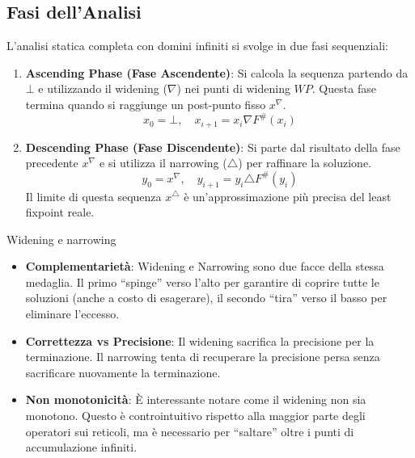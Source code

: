 \subsection{Fasi dell'Analisi}

L'analisi statica completa con domini infiniti si svolge in due fasi sequenziali:

\begin{enumerate}
    \item \textbf{Ascending Phase (Fase Ascendente)}:
    Si calcola la sequenza partendo da $\bot$ e utilizzando il widening
    ($\nabla$) nei punti di widening $WP$. Questa fase termina quando si
    raggiunge un post-punto fisso $x^\nabla$.
    \[ x_0 = \bot, \quad x_{i+1} = x_i \nabla F^\#(x_i) \]

    \item \textbf{Descending Phase (Fase Discendente)}:
    Si parte dal risultato della fase precedente $x^\nabla$ e si utilizza
    il narrowing ($\triangle$) per raffinare la soluzione.
    \[ y_0 = x^\nabla, \quad y_{i+1} = y_i \triangle F^\#(y_i) \]
    Il limite di questa sequenza $x^\triangle$ è un'approssimazione più
    precisa del least fixpoint reale.
\end{enumerate}

\begin{nota}{Widening e narrowing}{}
    
    \begin{itemize}
        \item \textbf{Complementarietà}: Widening e Narrowing sono due facce
        della stessa medaglia.
        Il primo ``spinge'' verso l'alto per garantire di coprire tutte le
        soluzioni (anche a costo di esagerare), il secondo ``tira'' verso il
        basso per eliminare l'eccesso.
        \item \textbf{Correttezza vs Precisione}: Il widening sacrifica la
        precisione per la terminazione.
        Il narrowing tenta di recuperare la precisione persa senza sacrificare
        nuovamente la terminazione.
        \item \textbf{Non monotonicità}: È interessante notare come il
        widening non sia monotono. Questo è controintuitivo rispetto alla
        maggior parte degli operatori sui reticoli, ma è necessario per
        ``saltare'' oltre i punti di accumulazione infiniti.
    \end{itemize}
\end{nota}